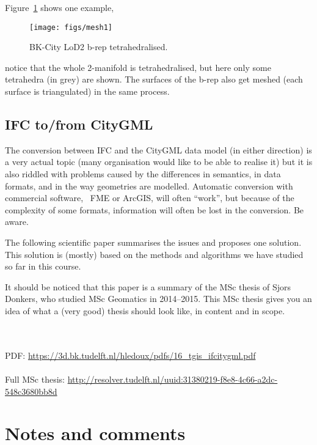 Figure~\ref{fig:meshing} shows one example,
\begin{figure}
  \centering
  \texttt{[image: figs/mesh1]}
  \caption{BK-City LoD2 b-rep tetrahedralised.}%
\label{fig:meshing}
\end{figure}
notice that the whole 2-manifold is tetrahedralised, but here only some tetrahedra (in grey) are shown. 
The surfaces of the b-rep also get meshed (each surface is triangulated) in the same process.


\subsection{IFC to/from CityGML}

The conversion between IFC and the CityGML data model (in either direction) is a very actual topic (many organisation would like to be able to realise it) but it is also riddled with problems caused by the differences in semantics, in data formats, and in the way geometries are modelled.
Automatic conversion with commercial software, \eg\ FME or ArcGIS, will often ``work'', but because of the complexity of some formats, information will often be lost in the conversion. 
Be aware.

The following scientific paper summarises the issues and proposes one solution. 
This solution is (mostly) based on the methods and algorithms we have studied so far in this course.

It should be noticed that this paper is a summary of the MSc thesis of Sjors Donkers, who studied MSc Geomatics in 2014--2015.
This MSc thesis gives you an idea of what a (very good) thesis should look like, in content and in scope.

\begin{myfloat}
  \begin{link-box}
  \\ \\
  PDF: \url{https://3d.bk.tudelft.nl/hledoux/pdfs/16_tgis_ifcitygml.pdf}
  \\ \\
  Full MSc thesis: \url{http://resolver.tudelft.nl/uuid:31380219-f8e8-4c66-a2dc-548c3680bb8d}
  \end{link-box}
\end{myfloat}

%
\section{Notes and comments}

